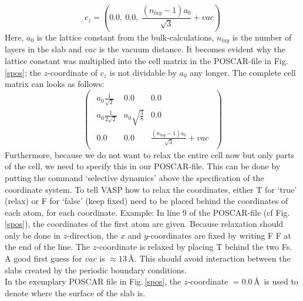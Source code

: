 \documentclass[11pt,oneside,a4paper, captions=nooneline, headsepline]{article}%
\begin{document}
\begin{equation}
c_z= \left(0.0,~0.0,~\frac{(n_{lay}-1)a_0}{\sqrt{3}} + vac\right)
\end{equation}
Here, $a_0$ is the lattice constant from the bulk-calculations, $n_{lay}$ is the number of layers in the slab and $vac$ is the vacuum distance. It becomes evident why the lattice constant was multiplied into the cell matrix in the POSCAR-file in Fig.\,\ref{spos}; the $z$-coordinate of $c_z$ is not dividable by $a_0$ any longer. The complete cell matrix can looks as follows:
\begin{equation}
\begin{pmatrix}\begin{matrix} a_0 \frac{1}{\sqrt{2}} & 0.0 & 0.0 \\ a_0\frac{1}{2\sqrt{2}} & a_0 \sqrt{\frac{3}{8}} & 0.0 \\0.0 & 0.0 & \frac{(n_{lay}-1)a_0}{\sqrt{3}} + vac \end{matrix} \end{pmatrix}
\end{equation}
Furthermore, because we do not want to relax the entire cell now but only parts of the cell, we need to specify this in our POSCAR-file. This can be done by putting the command `selective dynamics' above the specification of the coordinate system. To tell VASP how to relax the coordinates, either T for `true' (relax) or F for `false' (keep fixed) need to be placed behind the coordinates of each atom, for each coordinate. Example: In line 9 of the POSCAR-file (cf Fig.\,\ref{spos}), the coordinates of the first atom are given. Because relaxation should only be done in $z$-direction, the $x$ and $y$-coordinates are fixed by writing F F at the end of the line. The $z$-coordinate is relaxed by placing T behind the two Fs.\\
A good first guess for $vac$ is $\approx 13$\,\AA. This should avoid interaction between the slabs created by the periodic boundary conditions.\\
In the exemplary POSCAR file in Fig.\,\ref{spos}, the $z$-coordinate $=0.0$\,\AA~is used to denote where the surface of the slab is.\\
\end{document}
